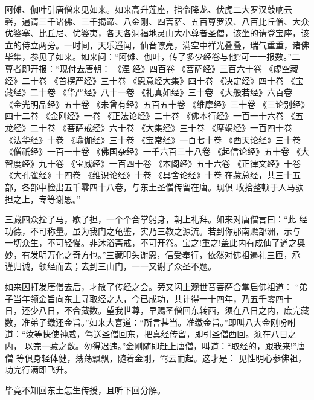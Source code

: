 阿傩、伽叶引唐僧来见如来。如来高升莲座，指令降龙、伏虎二大罗汉敲响云
磬，遍请三千诸佛、三千揭谛、八金刚、四菩萨、五百尊罗汉、八百比丘僧、大众
优婆塞、比丘尼、优婆夷，各天各洞福地灵山大小尊者圣僧，该坐的请登宝座，该
立的侍立两旁。一时间，天乐遥闻，仙音嘹亮，满空中祥光叠叠，瑞气重重，诸佛
毕集，参见了如来。如来问：“阿傩、伽叶，传了多少经卷与他?可一一报数。”二
尊者即开报：“现付去唐朝：
《涅经》四百卷
《菩萨经》三百六十卷
《虚空藏经》二十卷
《首楞严经》三十卷
《恩意经大集》四十卷
《决定经》四十卷
《宝藏经》二十卷
《华严经》八十一卷
《礼真如经》三十卷
《大般若经》六百卷
《金光明品经》五十卷
《未曾有经》五百五十卷
《维摩经》三十卷
《三论别经》四十二卷
《金刚经》一卷
《正法论经》二十卷
《佛本行经》一百一十六卷
《五龙经》二十卷
《菩萨戒经》六十卷
《大集经》三十卷
《摩竭经》一百四十卷
《法华经》十卷
《瑜伽经》三十卷
《宝常经》一百七十卷
《西天论经》三十卷
《僧祇经》一百一十卷
《佛国杂经》一千六百三十八卷
《起信论经》五十卷
《大智度经》九十卷
《宝威经》一百四十卷
《本阁经》五十六卷
《正律文经》十卷
《大孔雀经》十四卷
《维识论经》十卷
《具舍论经》十卷
在藏总经，共三十五部，各部中检出五千零四十八卷，与东土圣僧传留在唐。现俱
收拾整顿于人马驮担之上，专等谢恩。”

三藏四众拴了马，歇了担，一个个合掌躬身，朝上礼拜。如来对唐僧言曰：“此
经功德，不可称量。虽为我门之龟鉴，实乃三教之源流。若到你那南赡部洲，示与
一切众生，不可轻慢。非沐浴斋戒，不可开卷。宝之!重之!盖此内有成仙了道之奥
妙，有发明万化之奇方也。”三藏叩头谢恩，信受奉行，依然对佛祖遍礼三匝，承
谨归诚，领经而去；去到三山门，一一又谢了众圣不题。

如来因打发唐僧去后，才散了传经之会。旁又闪上观世音菩萨合掌启佛祖道：
“弟子当年领金旨向东土寻取经之人，今已成功，共计得一十四年，乃五千零四十
日，还少八日，不合藏数。望我世尊，早赐圣僧回东转西，须在八日之内，庶完藏
数，准弟子缴还金旨。”如来大喜道：“所言甚当。准缴金旨。”即叫八大金刚吩咐
道：“汝等快使神威，驾送圣僧回东，把真经传留，即引圣僧西回。须在八日之内，
以完一藏之数。勿得迟违。”金刚随即赶上唐僧，叫道：“取经的，跟我来!”唐僧
等俱身轻体健，荡荡飘飘，随着金刚，驾云而起。这才是：
见性明心参佛祖，功完行满即飞升。

毕竟不知回东土怎生传授，且听下回分解。